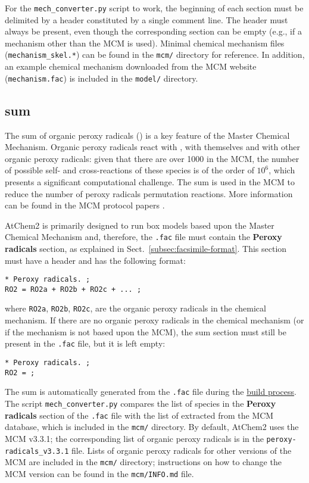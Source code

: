 For the \texttt{mech\_converter.py} script to work, the beginning of
each section must be delimited by a header constituted by a single
comment line. The header must always be present, even though the
corresponding section can be empty (e.g., if a mechanism other than
the MCM is used). Minimal chemical mechanism files
(\texttt{mechanism\_skel.*}) can be found in the \texttt{mcm/}
directory for reference. In addition, an example chemical mechanism
downloaded from the MCM website (\texttt{mechanism.fac}) is included
in the \texttt{model/} directory.

\subsection{ sum} \label{subsec:ro2-sum}

The sum of organic peroxy radicals () is a key feature of the
Master Chemical Mechanism. Organic peroxy radicals react with
, with themselves and with other organic peroxy radicals:
given that there are over 1000  in the MCM, the number of
possible self- and cross-reactions of these species is of the order of
$10^6$, which presents a significant computational challenge. The
 sum is used in the MCM to reduce the number of peroxy
radicals permutation reactions. More information can be found in the
MCM protocol papers \citep{jenkin_1997, saunders_2003}.

AtChem2 is primarily designed to run box models based upon the Master
Chemical Mechanism and, therefore, the \texttt{.fac} file must contain
the \textbf{Peroxy radicals} section, as explained in
Sect.~\ref{subsec:facsimile-format}. This section must have a header
and has the following format:

\begin{verbatim}
* Peroxy radicals. ;
RO2 = RO2a + RO2b + RO2c + ... ;
\end{verbatim}

where \texttt{RO2a}, \texttt{RO2b}, \texttt{RO2c}, are the organic
peroxy radicals in the chemical mechanism. If there are no organic
peroxy radicals in the chemical mechanism (or if the mechanism is not
based upon the MCM), the  sum section must still be present in
the \texttt{.fac} file, but it is left empty:

\begin{verbatim}
* Peroxy radicals. ;
RO2 = ;
\end{verbatim}

The  sum is automatically generated from the \texttt{.fac}
file during the \hyperref[subsec:build-process]{build process}. The
script \texttt{mech\_converter.py} compares the list of species in the
\textbf{Peroxy radicals} section of the \texttt{.fac} file with the
list of  extracted from the MCM database, which is included in
the \texttt{mcm/} directory. By default, AtChem2 uses the MCM v3.3.1;
the corresponding list of organic peroxy radicals is in the
\texttt{peroxy-radicals\_v3.3.1} file. Lists of organic peroxy
radicals for other versions of the MCM are included in the
\texttt{mcm/} directory; instructions on how to change the MCM version
can be found in the \texttt{mcm/INFO.md} file.

